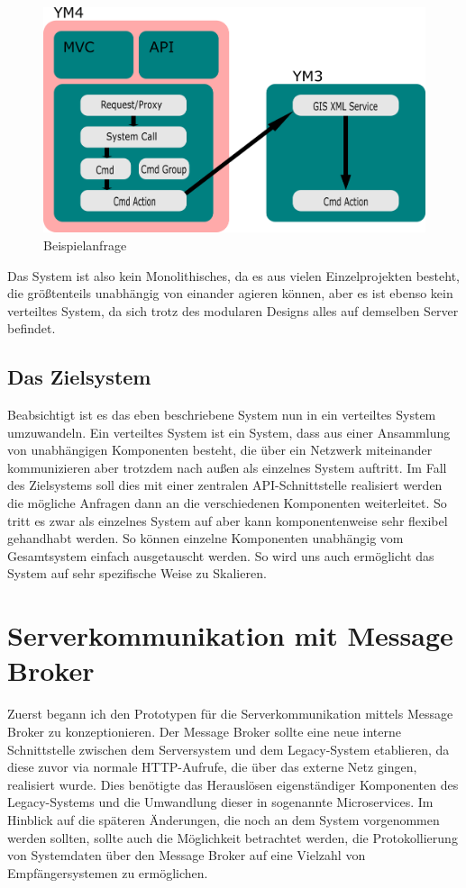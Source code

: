 \documentclass[12pt,a4paper]{scrartcl}
\begin{document}
\begin{figure}[h!]
	\centering
	\includegraphics[scale=2]{YmSysReq.png}
	\caption[Selbst erstellte Grafik]{Beispielanfrage}
\end{figure}

Das System ist also kein Monolithisches, da es aus vielen Einzelprojekten besteht, die größtenteils unabhängig von einander agieren können, aber es ist ebenso kein verteiltes System, da sich trotz des modularen Designs alles auf demselben Server befindet.

\subsection{Das Zielsystem}

Beabsichtigt ist es das eben beschriebene System nun in ein verteiltes System umzuwandeln. Ein verteiltes System ist ein System, dass aus einer Ansammlung von unabhängigen Komponenten besteht, die über ein Netzwerk miteinander kommunizieren aber trotzdem nach außen als einzelnes System auftritt. Im Fall des Zielsystems soll dies mit einer zentralen API-Schnittstelle realisiert werden die mögliche Anfragen dann an die verschiedenen Komponenten weiterleitet. So tritt es zwar als einzelnes System auf aber kann komponentenweise sehr flexibel gehandhabt werden. So können einzelne Komponenten unabhängig vom Gesamtsystem einfach ausgetauscht werden. So wird uns auch ermöglicht das System auf sehr spezifische Weise zu Skalieren.


\newpage
\section{Serverkommunikation mit Message Broker} \label{rabbit}
Zuerst begann ich den Prototypen für die Serverkommunikation mittels Message Broker zu konzeptionieren. Der Message Broker sollte eine neue interne Schnittstelle zwischen dem Serversystem und dem Legacy-System etablieren, da diese zuvor via normale HTTP-Aufrufe, die über das externe Netz gingen, realisiert wurde. Dies benötigte das Herauslösen eigenständiger Komponenten des Legacy-Systems und die Umwandlung dieser in sogenannte Microservices. Im Hinblick auf die späteren Änderungen, die noch an dem System vorgenommen werden sollten, sollte auch die Möglichkeit betrachtet werden, die Protokollierung von Systemdaten über den Message Broker auf eine Vielzahl von Empfängersystemen zu ermöglichen.
\end{document}
